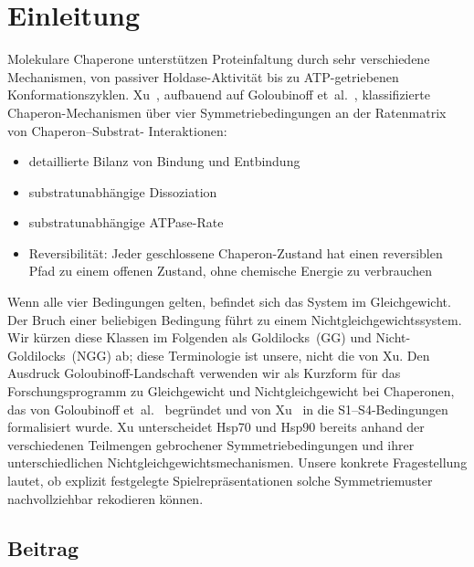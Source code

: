 \documentclass[12pt,a4paper]{article}
\begin{document}
\section{Einleitung}
\label{sec:intro}

Molekulare Chaperone unterstützen Proteinfaltung durch sehr verschiedene
Mechanismen, von passiver Holdase-Aktivität bis zu ATP-getriebenen
Konformationszyklen. Xu~\cite{Xu2022}, aufbauend auf Goloubinoff et~al.~\cite{Goloubinoff2018},
klassifizierte Chaperon-Mechanismen über
vier Symmetriebedingungen an der Ratenmatrix von Chaperon--Substrat-
Interaktionen:
\begin{itemize}
  \item[\textbf{S1}] detaillierte Bilanz von Bindung und Entbindung
  \item[\textbf{S2}] substratunabhängige Dissoziation
  \item[\textbf{S3}] substratunabhängige ATPase-Rate
  \item[\textbf{S4}] Reversibilität: Jeder geschlossene Chaperon-Zustand
    hat einen reversiblen Pfad zu einem offenen Zustand, ohne chemische
    Energie zu verbrauchen
\end{itemize}
Wenn alle vier Bedingungen gelten, befindet sich das System im
Gleichgewicht. Der Bruch einer beliebigen Bedingung führt zu einem
Nichtgleichgewichtssystem. Wir kürzen diese Klassen im Folgenden als
Goldilocks~(GG) und Nicht-Goldilocks~(NGG) ab; diese Terminologie ist
unsere, nicht die von Xu. Den Ausdruck \glqq Goloubinoff-Landschaft\grqq{}
verwenden wir als Kurzform für das Forschungsprogramm zu Gleichgewicht
und Nichtgleichgewicht bei Chaperonen, das von Goloubinoff et~al.~\cite{Goloubinoff2018}
begründet und von Xu~\cite{Xu2022} in die
S1--S4-Bedingungen formalisiert wurde. Xu unterscheidet Hsp70 und Hsp90
bereits anhand der verschiedenen Teilmengen gebrochener
Symmetriebedingungen und ihrer unterschiedlichen
Nichtgleichgewichtsmechanismen. Unsere konkrete Fragestellung lautet, ob explizit
festgelegte Spielrepräsentationen solche Symmetriemuster nachvollziehbar
rekodieren können.

\subsection{Beitrag}
\end{document}
